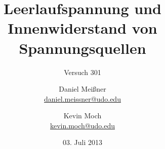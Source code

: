 


\newcommand{\name}[1]{\textsc{#1}}

\titlehead{{TU Dortmund \hfill SS~13}\\
Fakultät Physik\\
Experimentelle Übungen II}

\subject{Versuchsprotokoll}
\title{Leerlaufspannung und Innenwiderstand von Spannungsquellen}
\subtitle{Versuch 301}

\author{Daniel Meißner\\
{\normalsize\url{daniel.meissner@udo.edu}}
\and
Kevin Moch\\
{\normalsize\url{kevin.moch@udo.edu}}}

\date{03. Juli 2013}


\maketitle

\tableofcontents
\clearpage




\printbibliography
\nocite{v301}



